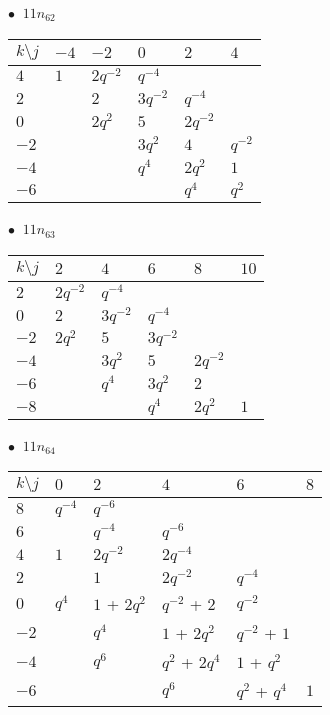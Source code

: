\begin{minipage}{\linewidth}
$\bullet\ $ $11n_{62}$ \vspace{0.5em} \\
\begin{tabular}{l|lllll}
$k \setminus j$ & $-4$ & $-2$ & $0$ & $2$ & $4$ \\
\hline
$4$ & $1$ & $2q^{-2}$ & $q^{-4}$ &  &  \\
$2$ &  & $2$ & $3q^{-2}$ & $q^{-4}$ &  \\
$0$ &  & $2q^{2}$ & $5$ & $2q^{-2}$ &  \\
$-2$ &  &  & $3q^{2}$ & $4$ & $q^{-2}$ \\
$-4$ &  &  & $q^{4}$ & $2q^{2}$ & $1$ \\
$-6$ &  &  &  & $q^{4}$ & $q^{2}$ \\
\end{tabular}
\vspace{2em}
\end{minipage}
%
\begin{minipage}{\linewidth}
$\bullet\ $ $11n_{63}$ \vspace{0.5em} \\
\begin{tabular}{l|lllll}
$k \setminus j$ & $2$ & $4$ & $6$ & $8$ & $10$ \\
\hline
$2$ & $2q^{-2}$ & $q^{-4}$ &  &  &  \\
$0$ & $2$ & $3q^{-2}$ & $q^{-4}$ &  &  \\
$-2$ & $2q^{2}$ & $5$ & $3q^{-2}$ &  &  \\
$-4$ &  & $3q^{2}$ & $5$ & $2q^{-2}$ &  \\
$-6$ &  & $q^{4}$ & $3q^{2}$ & $2$ &  \\
$-8$ &  &  & $q^{4}$ & $2q^{2}$ & $1$ \\
\end{tabular}
\vspace{2em}
\end{minipage}
%
\begin{minipage}{\linewidth}
$\bullet\ $ $11n_{64}$ \vspace{0.5em} \\
\begin{tabular}{l|lllll}
$k \setminus j$ & $0$ & $2$ & $4$ & $6$ & $8$ \\
\hline
$8$ & $q^{-4}$ & $q^{-6}$ &  &  &  \\
$6$ &  & $q^{-4}$ & $q^{-6}$ &  &  \\
$4$ & $1$ & $2q^{-2}$ & $2q^{-4}$ &  &  \\
$2$ &  & $1$ & $2q^{-2}$ & $q^{-4}$ &  \\
$0$ & $q^{4}$ & $1$ + $2q^{2}$ & $q^{-2}$ + $2$ & $q^{-2}$ &  \\
$-2$ &  & $q^{4}$ & $1$ + $2q^{2}$ & $q^{-2}$ + $1$ &  \\
$-4$ &  & $q^{6}$ & $q^{2}$ + $2q^{4}$ & $1$ + $q^{2}$ &  \\
$-6$ &  &  & $q^{6}$ & $q^{2}$ + $q^{4}$ & $1$ \\
\end{tabular}
\vspace{2em}
\end{minipage}
